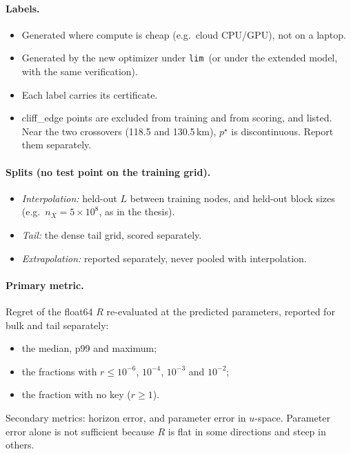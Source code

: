 \documentclass[11pt,a4paper]{article}
\newcommand{\plim}{\texttt{lim}}
\begin{document}
\paragraph{Labels.}
\begin{itemize}
\item Generated where compute is cheap (e.g.\ cloud CPU/GPU), not on a laptop.
\item Generated by the new optimizer under \plim\ (or under the extended model, with the same verification).
\item Each label carries its certificate.
\item cliff\_edge points are excluded from training and from scoring, and listed. Near the two crossovers
  (118.5 and 130.5\,km), $p^\star$ is discontinuous. Report them separately.
\end{itemize}

\paragraph{Splits (no test point on the training grid).}
\begin{itemize}
\item \emph{Interpolation:} held-out $L$ between training nodes, and held-out block sizes (e.g.\
  $n_X=5\times10^8$, as in the thesis).
\item \emph{Tail:} the dense tail grid, scored separately.
\item \emph{Extrapolation:} reported separately, never pooled with interpolation.
\end{itemize}

\paragraph{Primary metric.} Regret of the float64 $R$ re-evaluated at the predicted parameters, reported for bulk
and tail separately:
\begin{itemize}
\item the median, p99 and maximum;
\item the fractions with $r\le10^{-6}$, $10^{-4}$, $10^{-3}$ and $10^{-2}$;
\item the fraction with no key ($r\ge1$).
\end{itemize}
Secondary metrics: horizon error, and parameter error in $u$-space. Parameter error alone is not sufficient
because $R$ is flat in some directions and steep in others.
\end{document}
